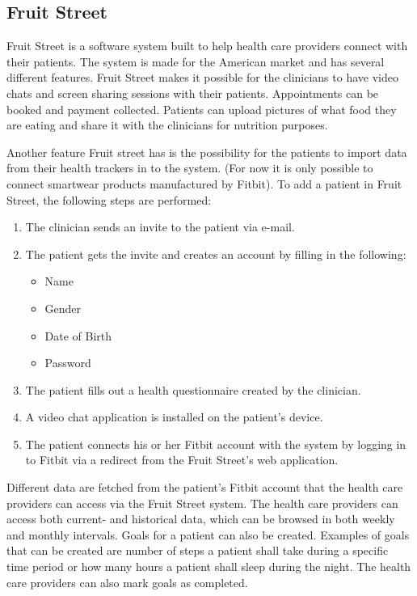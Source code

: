 \documentclass{cslthse-msc}
\begin{document}


\subsection{Fruit Street}

Fruit Street is a software system built to help health care providers connect with their patients. The system is made for the American market and has several different features. Fruit Street makes it possible for the clinicians to have video chats and screen sharing sessions with their patients. Appointments can be booked and payment collected. Patients can upload pictures of what food they are eating and share it with the clinicians for nutrition purposes. 

Another feature Fruit street has is the possibility for the patients to import data from their health trackers\cite{FruitStreet} in to the system. (For now it is only possible to connect smartwear products manufactured by Fitbit). To add a patient in Fruit Street, the following steps are performed:

\begin{enumerate}
    \item The clinician sends an invite to the patient via e-mail.
    \item The patient gets the invite and creates an account by filling in the following:
\begin{itemize}
    \item Name
    \item Gender
    \item Date of Birth
    \item Password
\end{itemize}
    \item The patient fills out a health questionnaire created by the clinician.
    \item A video chat application is installed on the patient’s device.
    \item The patient connects his or her Fitbit account with the system by logging in to Fitbit via a redirect from the Fruit Street's web application.
\end{enumerate}

Different data are fetched from the patient's Fitbit account that the health care providers can access via the Fruit Street system. The health care providers can access both current- and historical data, which can be browsed in both weekly and monthly intervals. Goals for a patient can also be created. Examples of goals that can be created are number of steps a patient shall take during a specific time period or how many hours a patient shall sleep during the night. The health care providers can also mark goals as completed. 
\end{document}
